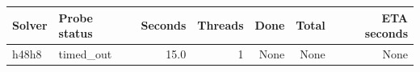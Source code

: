 {\small
\begin{tabular}{llrrrrr}
\hline
Solver & Probe status & Seconds & Threads & Done & Total & ETA seconds \\
\hline
h48h8 & timed\_out & 15.0 & 1 & None & None & None \\
\hline
\end{tabular}
}
